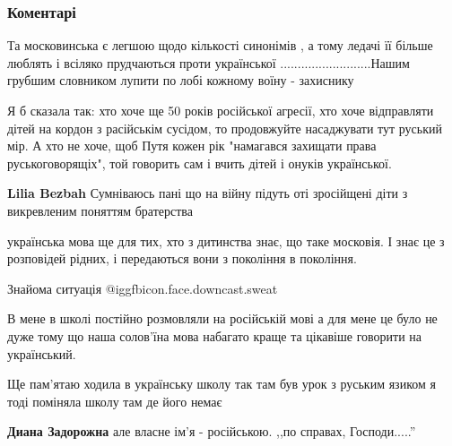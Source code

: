  
 
 
 
 
\subsubsection{Коментарі}
\label{sec:06_10_2021.fb.ukrainskoju_movoju_bud_laska.1.razgovor_mova_kiev.cmt}

\begin{itemize} %

Та московинська є легшою щодо кількості синонімів , а тому ледачі її більше
люблять і всіляко прудчаються проти української ..........................Нашим
грубшим словником лупити по лобі кожному воїну - захиснику


Я б сказала так: хто хоче ще 50 років російської агресії, хто хоче відправляти
дітей на кордон з расійськім сусідом, то продовжуйте насаджувати тут руський
мір. А хто не хоче, щоб Путя кожен рік "намагався захищати права
руськоговорящіх", той говорить сам і вчить дітей і онуків української.

\begin{itemize} %
\textbf{Lilia Bezbah} Сумніваюсь пані що на війну підуть оті зросійщені діти з викревленим поняттям братерства
\end{itemize} %

українська мова ще для тих, хто з дитинства знає, що таке московія. І знає це з розповідей рідних, і передаються вони з покоління в покоління.

Знайома ситуація @igg{fbicon.face.downcast.sweat} 


В мене в школі постійно розмовляли на російській мові а для мене це було не
дуже тому що наша солов'їна мова набагато краще та цікавіше говорити на
український.

Ще пам'ятаю ходила в українську школу так там був урок з руським язиком я тоді
поміняла школу там де його немає

\begin{itemize} %
\textbf{Диана Задорожна} але власне ім'я - російською. ,,по справах, Господи.....''


\end{itemize}
\end{itemize}
